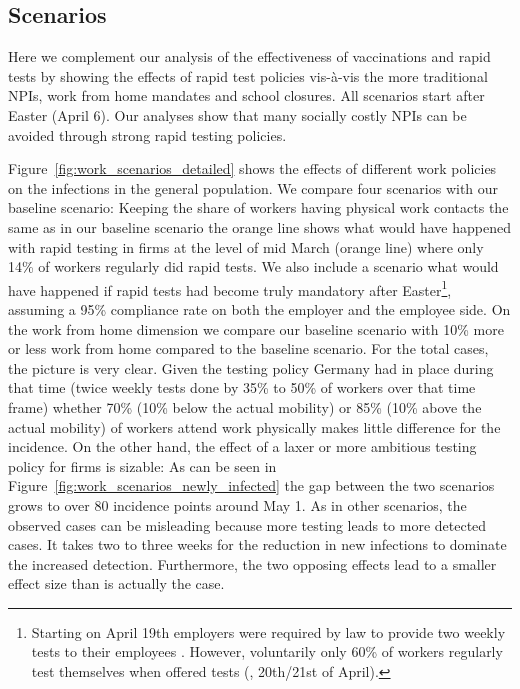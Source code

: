 \subsection{Scenarios}
\label{subsec:appendix_scenarios}

Here we complement our analysis of the effectiveness of vaccinations and
rapid tests by showing the effects of rapid test policies vis-à-vis the more traditional
NPIs, work from home mandates and school closures. All scenarios start after Easter
(April 6). Our analyses show that many socially costly NPIs can be avoided through strong
rapid testing policies.

Figure~\ref{fig:work_scenarios_detailed} shows the effects of different work policies on
the infections in the general population. We compare four scenarios with our baseline
scenario: Keeping the share of workers having physical work contacts the same as in our
baseline scenario the orange line shows what would have happened with rapid testing in
firms at the level of mid March (orange line) where only 14\% of workers regularly did
rapid tests. %
We also include a scenario what would have happened if rapid tests had become truly
mandatory after Easter\footnote{Starting on April 19th employers were required by law to
provide two weekly tests to their employees \citep{Bundesanzeiger2021}. However,
voluntarily only 60\% of workers regularly test themselves when offered tests
(\cite{Betsch2021}, 20th/21st of April).}, assuming a 95\% compliance rate on both the
employer and the employee side. On the work from home dimension we compare our baseline
scenario with 10\% more or less work from home compared to the baseline scenario. For the
total cases, the picture is very clear. Given the testing policy Germany had in place
during that time (twice weekly tests done by 35\% to 50\% of workers over that time
frame) whether 70\% (10\% below the actual mobility) or 85\% (10\% above the actual
mobility) of workers attend work physically makes little difference for the incidence. On
the other hand, the effect of a laxer or more ambitious testing policy for firms is
sizable: As can be seen in Figure~\ref{fig:work_scenarios_newly_infected} the gap between
the two scenarios grows to over 80 incidence points around May 1.%
As in other scenarios, the observed cases can be misleading because more testing leads to
more detected cases. It takes two to three weeks for the reduction in new infections to
dominate the increased detection. Furthermore, the two opposing effects lead to a
smaller effect size than is actually the case.


